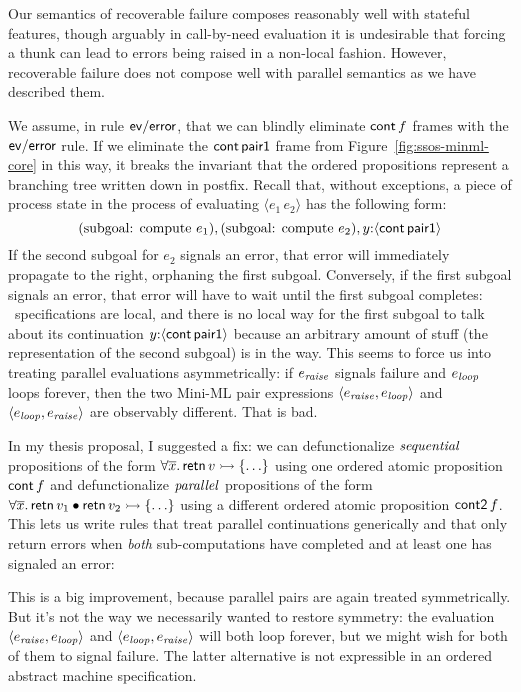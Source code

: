Our semantics of recoverable failure composes reasonably well with
stateful features, though arguably in call-by-need
evaluation it is undesirable that forcing a thunk can lead to errors
being raised in a non-local fashion. However,
recoverable failure does not compose well with parallel semantics as
we have described them. 

We assume, in rule ${\sf ev/error}$, that we can blindly eliminate
${\sf cont}\,f$ frames with the ${\sf ev/error}$ rule.  If we
eliminate the ${\sf cont}\,{\sf pair1}$ frame from
Figure~\ref{fig:ssos-minml-core} in this way, it breaks the invariant
that the ordered propositions represent a branching tree written down
in postfix. Recall that, without exceptions, a piece of process state
in the process of evaluating $\langle e_1\,e_2\rangle$ has the
following form:
\[
\mbox{(subgoal: compute $e_1$)},
\mbox{(subgoal: compute $e_2$)},
y{:}\langle {{\sf cont}\,{\sf pair1}} \rangle 
\]
If the second subgoal for $e_2$ signals an error, that error will
immediately propagate to the right, orphaning the first subgoal.
Conversely, if the first subgoal signals an error, that error will
have to wait until the first subgoal completes: \sls~specifications
are local, and there is no local way for the first subgoal to talk
about its continuation $y{:}\langle {{\sf cont}\,{\sf pair1}} \rangle$ because an
arbitrary amount of stuff (the representation of the second subgoal)
is in the way. This seems to force us into treating parallel
evaluations asymmetrically: if $e_{\it raise}$ signals failure and
$e_{\it loop}$ loops forever, then the two Mini-ML pair expressions
$\langle e_{\it raise}, e_{\it loop} \rangle$ and $\langle e_{\it
  loop}, e_{\it raise} \rangle$ are observably different. That is bad.

In my thesis proposal, I suggested a fix: we can defunctionalize ${\it
  sequential}$ propositions of the form $\forall \overline{x}.\,{\sf
  retn}\,v \rightarrowtail \{\ldots \}$ using one ordered atomic proposition
${\sf cont}\,f$ and defunctionalize ${\it parallel}$ propositions of
the form $\forall \overline{x}.\,{\sf retn}\,v_1 \mathbin{\bullet} {\sf retn}\,v_2
\rightarrowtail \{\ldots \}$ using a different ordered atomic proposition ${\sf
  cont2}\,f$. This lets us write rules that treat parallel continuations
generically and that only return errors when {\it both} sub-computations
have completed and at least one has signaled an error: 


\noindent
This is a big improvement, because parallel pairs are again treated
symmetrically. But it's not the way we necessarily wanted to restore
symmetry: the evaluation $\langle e_{\it raise}, e_{\it loop} \rangle$
and $\langle e_{\it loop}, e_{\it raise} \rangle$ will both loop
forever, but we might wish for both of them to signal failure. The
latter alternative is not expressible in an ordered abstract machine
specification.

